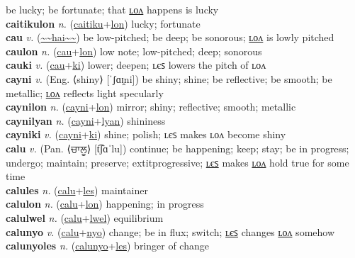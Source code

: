 be lucky; be fortunate; that \hyperref[caitikulon]{ʟᴏᴧ} happens is lucky \label{caitiku} \\
\textbf{caitikulon} \textit{n.} (\hyperref[caitiku]{caitiku}+\hyperref[lon]{lon})
lucky; fortunate \label{caitikulon} \\
\textbf{cau} \textit{v.} (\hyperref[hai]{\~{}\~{}hai\~{}\~{}})
be low-pitched; be deep; be sonorous; \hyperref[caulon]{ʟᴏᴧ} is lowly pitched \label{cau} \\
\textbf{caulon} \textit{n.} (\hyperref[cau]{cau}+\hyperref[lon]{lon})
low note; low-pitched; deep; sonorous \label{caulon} \\
\textbf{cauki} \textit{v.} (\hyperref[cau]{cau}+\hyperref[ki]{ki})
lower; deepen; ʟєꜱ lowers the pitch of ʟᴏᴧ \label{cauki} \\
\textbf{cayni} \textit{v.} (Eng. ⟨shiny⟩ [ˈʃɑɪ̯ni])
be shiny; shine; be reflective; be smooth; be metallic; \hyperref[caynilon]{ʟᴏᴧ} reflects light specularly \label{cayni} \\
\textbf{caynilon} \textit{n.} (\hyperref[cayni]{cayni}+\hyperref[lon]{lon})
mirror; shiny; reflective; smooth; metallic \label{caynilon} \\
\textbf{caynilyan} \textit{n.} (\hyperref[cayni]{cayni}+\hyperref[lyan]{lyan})
shininess \label{caynilyan} \\
\textbf{cayniki} \textit{v.} (\hyperref[cayni]{cayni}+\hyperref[ki]{ki})
shine; polish; ʟєꜱ makes ʟᴏᴧ become shiny \label{cayniki} \\
\textbf{calu} \textit{v.} (Pan. ⟨ਚਾਲੂ⟩ [t͡ʃɑˈlu])
continue; be happening; keep; stay; be in progress; undergo; maintain; preserve; 	extit{progressive}; \hyperref[calules]{ʟєꜱ} makes \hyperref[calulon]{ʟᴏᴧ} hold true for some time \label{calu} \\
\textbf{calules} \textit{n.} (\hyperref[calu]{calu}+\hyperref[les]{les})
maintainer \label{calules} \\
\textbf{calulon} \textit{n.} (\hyperref[calu]{calu}+\hyperref[lon]{lon})
happening; in progress \label{calulon} \\
\textbf{calulwel} \textit{n.} (\hyperref[calu]{calu}+\hyperref[lwel]{lwel})
equilibrium \label{calulwel} \\
\textbf{calunyo} \textit{v.} (\hyperref[calu]{calu}+\hyperref[nyo]{nyo})
change; be in flux; switch; \hyperref[calunyoles]{ʟєꜱ} changes \hyperref[calunyolon]{ʟᴏᴧ} somehow \label{calunyo} \\
\textbf{calunyoles} \textit{n.} (\hyperref[calunyo]{calunyo}+\hyperref[les]{les})
bringer of change \label{calunyoles} \\
